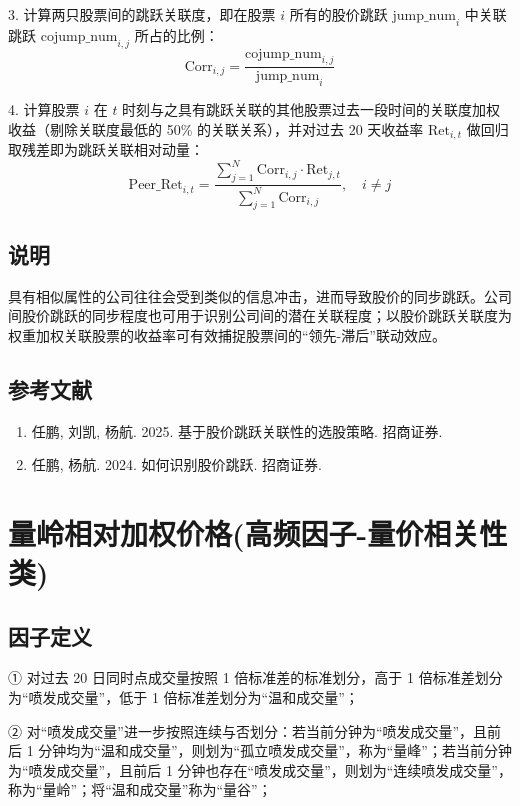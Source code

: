 \documentclass{article}
\begin{document}
3. 计算两只股票间的跳跃关联度，即在股票 \( i \) 所有的股价跳跃 \( \mathrm{jump\_num}_i \) 中关联跳跃 \( \mathrm{cojump\_num}_{i,j} \) 所占的比例：
\begin{equation}
    \mathrm{Corr}_{i,j} = \frac{\mathrm{cojump\_num}_{i,j}}{\mathrm{jump\_num}_i}
\end{equation}

4. 计算股票 \( i \) 在 \( t \) 时刻与之具有跳跃关联的其他股票过去一段时间的关联度加权收益（剔除关联度最低的 50\% 的关联关系），并对过去 20 天收益率 \( \mathrm{Ret}_{i,t} \) 做回归取残差即为跳跃关联相对动量：
\begin{equation}
    \mathrm{Peer\_Ret}_{i,t} = \frac{\sum_{j=1}^{N} \mathrm{Corr}_{i,j} \cdot \mathrm{Ret}_{j,t}}{\sum_{j=1}^{N} \mathrm{Corr}_{i,j}}, \quad i \neq j
\end{equation}


\subsection{说明}
具有相似属性的公司往往会受到类似的信息冲击，进而导致股价的同步跳跃。公司间股价跳跃的同步程度也可用于识别公司间的潜在关联程度；以股价跳跃关联度为权重加权关联股票的收益率可有效捕捉股票间的“领先-滞后”联动效应。

\subsection{参考文献}
\begin{enumerate}
    \item 任鹏, 刘凯, 杨航. 2025. 基于股价跳跃关联性的选股策略. 招商证券.
    \item 任鹏, 杨航. 2024. 如何识别股价跳跃. 招商证券.
\end{enumerate}

\section{量岭相对加权价格(高频因子-量价相关性类)}

\subsection{因子定义}


① 对过去 20 日同时点成交量按照 1 倍标准差的标准划分，高于 1 倍标准差划分为“喷发成交量”，低于 1 倍标准差划分为“温和成交量”；

② 对“喷发成交量”进一步按照连续与否划分：若当前分钟为“喷发成交量”，且前后 1 分钟均为“温和成交量”，则划为“孤立喷发成交量”，称为“量峰”；若当前分钟为“喷发成交量”，且前后 1 分钟也存在“喷发成交量”，则划为“连续喷发成交量”，称为“量岭”；将“温和成交量”称为“量谷”；
\end{document}

